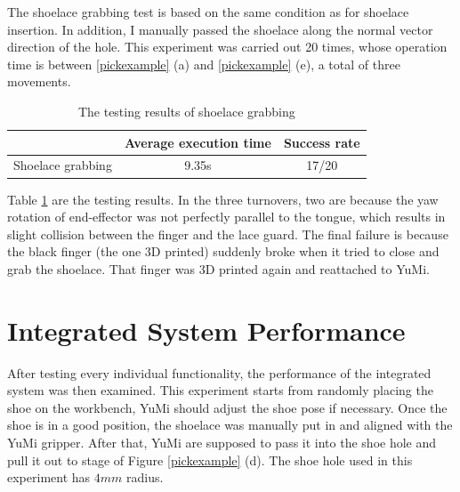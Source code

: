 The shoelace grabbing test is based on the same condition as for shoelace insertion. In addition, I manually passed the shoelace along the normal vector direction of the hole. This experiment was carried out 20 times, whose operation time is between \ref{pickexample} (a) and \ref{pickexample} (e), a total of three movements. 

\begin{table}[H]
\centering
\begin{tabular}{||c||c|c||}
\hline
 & Average execution time & Success rate \\ \hline \hline
Shoelace grabbing & 9.35s & 17/20 \\ \hline
\end{tabular}
\caption{The testing results of shoelace grabbing}
\label{pull}
\end{table}

Table \ref{pull} are the testing results. In the three turnovers, two are because the yaw rotation of end-effector was not perfectly parallel to the tongue, which results in slight collision between the finger and the lace guard. The final failure is because the black finger (the one 3D printed) suddenly broke when it tried to close and grab the shoelace. That finger was 3D printed again and reattached to YuMi.

\section{Integrated System Performance}
After testing every individual functionality, the performance of the integrated system was then examined. This experiment starts from randomly placing the shoe on the workbench, YuMi should adjust the shoe pose if necessary. Once the shoe is in a good position, the shoelace was manually put in and aligned with the YuMi gripper. After that, YuMi are supposed to pass it into the shoe hole and pull it out to stage of Figure \ref{pickexample} (d). The shoe hole used in this experiment has $4mm$ radius.

